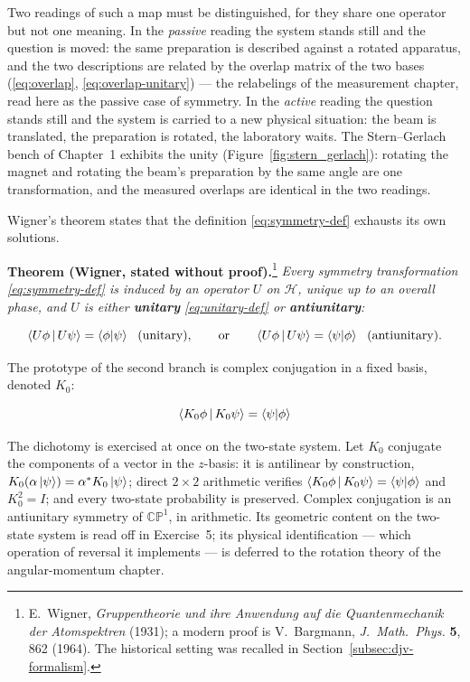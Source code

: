 Two readings of such a map must be distinguished, for they share one operator but not one meaning. In the \emph{passive} reading the system stands still and the question is moved: the same preparation is described against a rotated apparatus, and the two descriptions are related by the overlap matrix of the two bases (\eqref{eq:overlap}, \eqref{eq:overlap-unitary}) --- the relabelings of the measurement chapter, read here as the passive case of symmetry. In the \emph{active} reading the question stands still and the system is carried to a new physical situation: the beam is translated, the preparation is rotated, the laboratory waits. The Stern--Gerlach bench of Chapter~1 exhibits the unity (Figure~\ref{fig:stern_gerlach}): rotating the magnet and rotating the beam's preparation by the same angle are one transformation, and the measured overlaps are identical in the two readings.

Wigner's theorem states that the definition \eqref{eq:symmetry-def} exhausts its own solutions.

\medskip\noindent\textbf{Theorem (Wigner, stated without proof).}\footnote{E.~Wigner, \emph{Gruppentheorie und ihre Anwendung auf die Quantenmechanik der Atomspektren} (1931); a modern proof is V.~Bargmann, \emph{J.~Math.~Phys.} \textbf{5}, 862 (1964). The historical setting was recalled in Section~\ref{subsec:djv-formalism}.} \emph{Every symmetry transformation \eqref{eq:symmetry-def} is induced by an operator $U$ on $\mathcal{H}$, unique up to an overall phase, and $U$ is either \textbf{unitary} \eqref{eq:unitary-def} or \textbf{antiunitary}:}
\begin{linenomath}
    \begin{equation}
        \braket{U\phi\,|\,U\psi} = \braket{\phi|\psi}\ \ \text{(unitary)}, \qquad\text{or}\qquad \braket{U\phi\,|\,U\psi} = \braket{\psi|\phi}\ \ \text{(antiunitary)} .
        \label{eq:wigner}
    \end{equation}
\end{linenomath}
The prototype of the second branch is complex conjugation in a fixed basis, denoted $K_0$:
\begin{linenomath}
    \begin{equation}
        \braket{K_0\phi\,|\,K_0\psi} = \braket{\psi|\phi}
        \label{eq:antiunitary-def}
    \end{equation}
\end{linenomath}
The dichotomy is exercised at once on the two-state system. Let $K_0$ conjugate the components of a vector in the $z$-basis: it is antilinear by construction, $K_0(\alpha\ket{\psi})=\alpha^{*}K_0\ket{\psi}$; direct $2\times2$ arithmetic verifies $\braket{K_0\phi\,|\,K_0\psi}=\braket{\psi|\phi}$ and $K_0^2=I$; and every two-state probability is preserved. Complex conjugation is an antiunitary symmetry of $\mathbb{CP}^1$, in arithmetic. Its geometric content on the two-state system is read off in Exercise~5; its physical identification --- which operation of reversal it implements --- is deferred to the rotation theory of the angular-momentum chapter.

